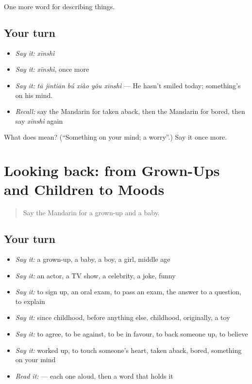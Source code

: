 \begin{grammarlens}[title={What you've built}]
One more word for describing things.
\end{grammarlens}

\subsection*{Your turn}
\begin{itemize}
\raggedright
  \item \emph{Say it:} \emph{xīnshì}
  \item \emph{Say it:} \emph{xīnshì}, once more
  \item \emph{Say it:} \emph{tā jīntiān bú xiào yǒu xīnshì} — He hasn't smiled today; something's on his mind.
  \item \emph{Recall:} say the Mandarin for taken aback, then the Mandarin for bored, then say \emph{xīnshì} again
\end{itemize}

\begin{tcolorbox}[breakable,colback=teal!4,colframe=teal!35!black,title={Before you move on}]
What does  mean? (\textquotedblleft{}Something on your mind; a worry\textquotedblright{}.) Say it once more.
\end{tcolorbox}
\section[(dialogue)]{Looking back: from Grown-Ups and Children to Moods}

\label{lesson:ZH-R271-review-266-271}



\begin{quote}
Say the Mandarin for a grown-up and a baby.
\end{quote}

\subsection*{Your turn}
\begin{itemize}
\raggedright
  \item \emph{Say it:} a grown-up, a baby, a boy, a girl, middle age
  \item \emph{Say it:} an actor, a TV show, a celebrity, a joke, funny
  \item \emph{Say it:} to sign up, an oral exam, to pass an exam, the answer to a question, to explain
  \item \emph{Say it:} since childhood, before anything else, childhood, originally, a toy
  \item \emph{Say it:} to agree, to be against, to be in favour, to back someone up, to believe
  \item \emph{Say it:} worked up, to touch someone's heart, taken aback, bored, something on your mind
  \item \emph{Read it:}   — each one aloud, then a word that holds it
\end{itemize}


